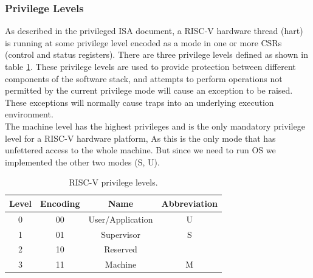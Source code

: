 \documentclass[../main.tex]{subfiles}
\begin{document}
\subsubsection{Privilege Levels}
As described in the privileged ISA document, a RISC-V hardware thread (hart) is running at some privilege level encoded as a mode in one or more CSRs (control and status registers). There are three privilege levels defined as shown in table \ref{tab:modes}. These privilege levels are used to provide protection between different components of the software stack, and attempts to perform operations not permitted by the current privilege mode will cause an exception to be raised. These exceptions will normally cause traps into an underlying execution environment.\\
\newline
\noindent The machine level has the highest privileges and is the only mandatory privilege level for a RISC-V hardware platform, As this is the only mode that has unfettered access to the whole machine. But since we need to run OS we implemented the other two modes (S, U).

\begin{table}[h]
\begin{center}
\begin{tabular}{ |c|c|c|c| } 
\hline
Level & Encoding & Name & Abbreviation \\
\hline
0 & 00 & User/Application & U \\ 
1 & 01 & Supervisor & S \\ 
2 & 10 & Reserved &  \\ 
3 & 11 & Machine & M \\
\hline
\end{tabular}
\end{center}
\caption{RISC-V privilege levels.}
\label{tab:modes}
\end{table}
\end{document}

